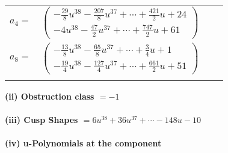 \documentclass[1p]{elsarticle_modified}
\theoremstyle{definition}
\begin{document}
\begin{tabular}{m{7pt} m{180pt} m{7pt} m{180pt} }
\flushright $a_{4}=$&$\begin{pmatrix}-\frac{29}{8} u^{38}-\frac{207}{8} u^{37}+\cdots+\frac{421}{2} u+24\\-4 u^{38}-\frac{47}{2} u^{37}+\cdots+\frac{747}{2} u+61\end{pmatrix}$ \\
\flushright $a_{8}=$&$\begin{pmatrix}-\frac{13}{8} u^{38}-\frac{65}{8} u^{37}+\cdots+\frac{3}{4} u+1\\-\frac{19}{4} u^{38}-\frac{127}{4} u^{37}+\cdots+\frac{661}{2} u+51\end{pmatrix}$\\&\end{tabular}
\flushleft \textbf{(ii) Obstruction class $= -1$}\\~\\
\flushleft \textbf{(iii) Cusp Shapes $= 6 u^{38}+36 u^{37}+\cdots-148 u-10$}\\~\\
\newpage\renewcommand{\arraystretch}{1}
\flushleft \textbf{(iv) u-Polynomials at the component}\newline \\
\end{document}

